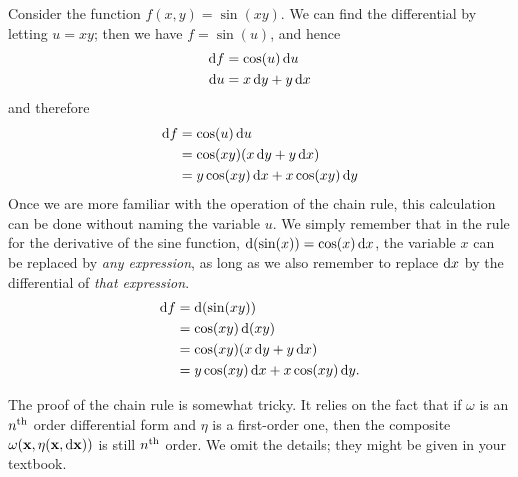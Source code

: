 \documentclass[12pt]{amsart}
\begin{document}
\begin{eg}
  Consider the function $f(x,y) = \sin (xy)$.
  We can find the differential by letting $u=xy$; then we have $f = \sin(u)$, and hence
  \begin{align*}
    \mathrm{d} f &= \cos(u)\,\mathrm{d} u\\
    \mathrm{d} u &= x\,\mathrm{d} y + y\,\mathrm{d} x
  \end{align*}
  and therefore
  \begin{align*}
    \mathrm{d} f &= \cos(u)\,\mathrm{d} u \\
    &= \cos(xy) (x\,\mathrm{d} y + y\,\mathrm{d} x)\\
    &= y\cos(xy)\,\mathrm{d} x + x\cos(xy)\,\mathrm{d} y
  \end{align*}
  Once we are more familiar with the operation of the chain rule, this calculation can be done without naming the variable $u$.
  We simply remember that in the rule for the derivative of the sine function, $\mathrm{d}(\sin(x)) = \cos(x) \, \mathrm{d} x$, the variable $x$ can be replaced by \emph{any expression}, as long as we also remember to replace $\mathrm{d} x$ by the differential of \emph{that expression}.
  \begin{align*}
    \mathrm{d} f &= \mathrm{d}(\sin(xy))\\
    &= \cos(xy) \, \mathrm{d}(xy)\\
    &= \cos(xy) (x\,\mathrm{d} y + y\,\mathrm{d} x)\\
    &= y\cos(xy)\,\mathrm{d} x + x\cos(xy)\,\mathrm{d} y.
  \end{align*}
\end{eg}

The proof of the chain rule is somewhat tricky.
It relies on the fact that if $\omega$ is an $n^{\mathrm{th}}$ order differential form and $\eta$ is a first-order one, then the composite $\omega(\mathbf{x},\eta(\mathbf{x},\mathrm{d} \mathbf{x}))$ is still $n^{\mathrm{th}}$ order.
We omit the details; they might be given in your textbook.
\end{document}
